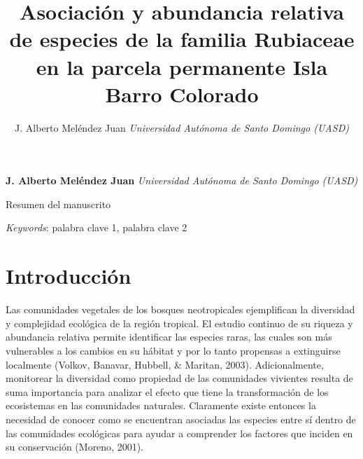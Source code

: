 \documentclass[11pt,]{article}
\title{Asociación y abundancia relativa de especies de la familia Rubiaceae en
la parcela permanente Isla Barro Colorado  }
\author{\Large J. Alberto Meléndez Juan\vspace{0.05in} \newline\normalsize\emph{Universidad Autónoma de Santo Domingo (UASD)}  }
\date{}
\newcommand*{\authorfont}{\fontfamily{phv}\selectfont}
\renewenvironment{abstract}
 {{%
    \setlength{\leftmargin}{0mm}
    \setlength{\rightmargin}{\leftmargin}%
  }%
  \relax}
 {\endlist}
\begin{document}
	
%

{%
\setlength{\parindent}{0pt}
\thispagestyle{plain}
{\fontsize{18}{20}\selectfont\raggedright 
\maketitle  %

}

{
   \vskip 13.5pt\relax \normalsize\fontsize{11}{12} 
\textbf{\authorfont J. Alberto Meléndez Juan} \hskip 15pt \emph{\small Universidad Autónoma de Santo Domingo (UASD)}   

}

}








\begin{abstract}

    \hbox{\vrule height .2pt width 39.14pc}

    \vskip 8.5pt %

\noindent Resumen del manuscrito


\vskip 8.5pt \noindent \emph{Keywords}: palabra clave 1, palabra clave 2 \par

    \hbox{\vrule height .2pt width 39.14pc}



\end{abstract}


\vskip 6.5pt


\noindent  \section{Introducción}\label{introducciuxf3n}

Las comunidades vegetales de los bosques neotropicales ejemplifican la
diversidad y complejidad ecológica de la región tropical. El estudio
continuo de su riqueza y abundancia relativa permite identificar las
especies raras, las cuales son más vulnerables a los cambios en su
hábitat y por lo tanto propensas a extinguirse localmente (Volkov,
Banavar, Hubbell, \& Maritan, 2003). Adicionalmente, monitorear la
diversidad como propiedad de las comunidades vivientes resulta de suma
importancia para analizar el efecto que tiene la transformación de los
ecosistemas en las comunidades naturales. Claramente existe entonces la
necesidad de conocer como se encuentran asociadas las especies entre sí
dentro de las comunidades ecológicas para ayudar a comprender los
factores que inciden en su conservación (Moreno, 2001).
\end{document}
